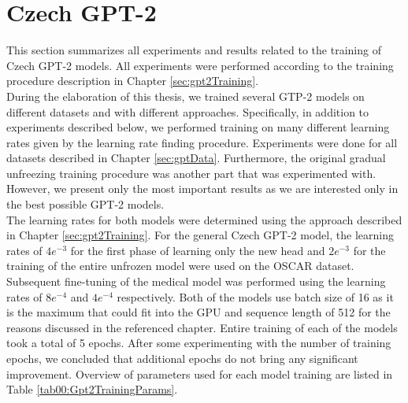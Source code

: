 \section{Czech GPT-2}
\label{sec:gpt2Experiments}
This section summarizes all experiments and results related to the training of Czech GPT-2 models. All experiments were performed according to the training procedure description in Chapter \ref{sec:gpt2Training}.\\

During the elaboration of this thesis, we trained several GTP-2 models on different datasets and with different approaches. Specifically, in addition to experiments described below, we performed training on many different learning rates given by the learning rate finding procedure. Experiments were done for all datasets described in Chapter \ref{sec:gptData}. Furthermore, the original gradual unfreezing training procedure was another part that was experimented with. However, we present only the most important results as we are interested only in the best possible GPT-2 models.\\

The learning rates for both models were determined using the approach described in Chapter \ref{sec:gpt2Training}. For the general Czech GPT-2 model, the learning rates of $4e^{-3}$ for the first phase of learning only the new head and $2e^{-3}$ for the training of the entire unfrozen model were used on the OSCAR dataset. Subsequent fine-tuning of the medical model was performed using the learning rates of $8e^{-4}$ and $4e^{-4}$ respectively. Both of the models use batch size of 16 as it is the maximum that could fit into the GPU and sequence length of 512 for the reasons discussed in the referenced chapter. Entire training of each of the models took a total of 5 epochs. After some experimenting with the number of training epochs, we concluded that additional epochs do not bring any significant improvement. Overview of parameters used for each model training are listed in Table \ref{tab00:Gpt2TrainingParams}.

